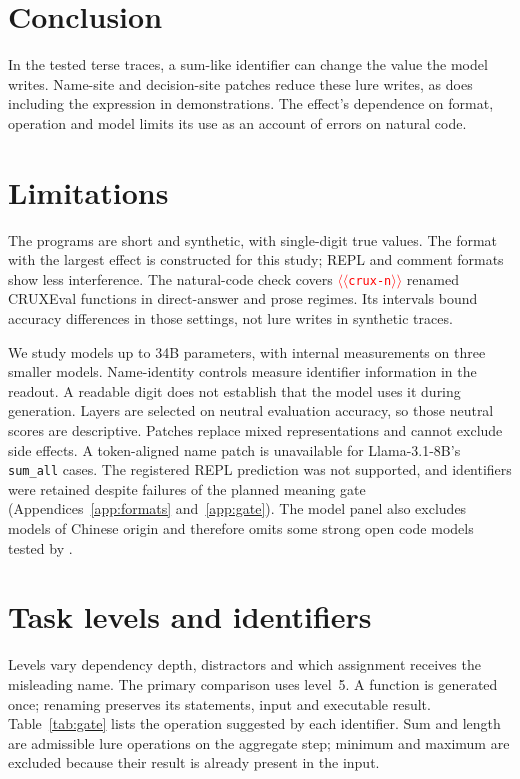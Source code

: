 \documentclass[11pt]{article}
\providecommand{\NUM}[1]{\textcolor{red}{$\langle\langle$\texttt{#1}$\rangle\rangle$}}
\begin{document}
\section{Conclusion}

In the tested terse traces, a sum-like identifier can change the value the model writes.
Name-site and decision-site patches reduce these
lure writes, as does including the expression in demonstrations. The effect's dependence on
format, operation and model limits its use as an account of errors on natural code.

\section*{Limitations}

The programs are short and synthetic, with single-digit true values. The format with the
largest effect is constructed for this study; REPL and comment formats show less interference.
The natural-code check covers \NUM{crux-n} renamed CRUXEval functions in direct-answer and
prose regimes. Its intervals bound accuracy differences in those settings, not lure writes in
synthetic traces.

We study models up to 34B parameters, with internal measurements on three smaller models.
Name-identity controls measure identifier information in the readout. A readable digit
does not establish that the model uses it during generation. Layers are selected on neutral
evaluation accuracy, so those neutral scores are descriptive. Patches replace mixed representations and
cannot exclude side effects. A token-aligned name patch is unavailable for Llama-3.1-8B's
\texttt{sum\_all} cases. The registered REPL prediction was not supported, and identifiers
were retained despite failures of the planned meaning gate
(Appendices~\ref{app:formats} and~\ref{app:gate}). The model panel also excludes models of Chinese origin and
therefore omits some strong open code models tested by \citet{le2026obfuscated}.



\appendix

\section{Task levels and identifiers}
\label{app:levels}

Levels vary dependency depth, distractors and which assignment receives the misleading name.
The primary comparison uses level~5. A function is generated once; renaming preserves its
statements, input and executable result. Table~\ref{tab:gate} lists the operation suggested by
each identifier. Sum and length are admissible lure operations on the aggregate step; minimum
and maximum are excluded because their result is already present in the input.
\end{document}
